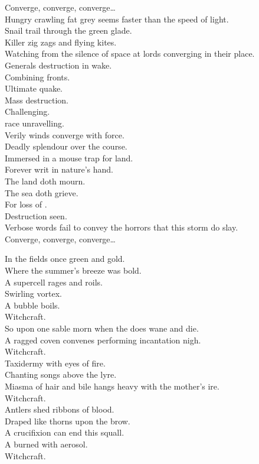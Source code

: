 Converge, converge, converge… \\

Hungry crawling fat grey   seems faster than the speed of light. \\
Snail trail through the green glade. \\
Killer zig zags and flying kites. \\
Watching from the silence of space at lords converging in their place. \\
Generals destruction in wake. \\
Combining fronts. \\
Ultimate quake. \\

Mass destruction. \\
Challenging. \\
 race unravelling. \\

Verily winds converge with force. \\
Deadly splendour over the course. \\
Immersed in a mouse trap for land. \\
Forever writ in nature's hand. \\
The land doth mourn. \\
The sea doth grieve. \\
For loss of . \\
Destruction seen. \\
Verbose words fail to convey the horrors that this storm do slay. \\

Converge, converge, converge… \\



In the fields once green and gold. \\
Where the summer's breeze was bold. \\
A supercell rages and roils. \\
Swirling vortex. \\
A bubble boils. \\
Witchcraft. \\
So upon one sable morn when the  does wane and die. \\
A ragged coven convenes performing incantation nigh. \\
Witchcraft. \\
Taxidermy with eyes of fire. \\
Chanting songs above the lyre. \\
Miasma of hair and bile hangs heavy with the mother's ire. \\
Witchcraft. \\
Antlers shed ribbons of blood. \\
Draped like thorns upon the brow. \\
A crucifixion can end this squall. \\
A  burned with aerosol. \\
Witchcraft. \\

